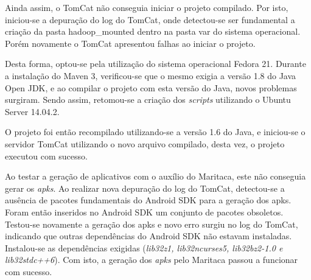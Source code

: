 Ainda assim, o TomCat não conseguia iniciar o projeto compilado. Por isto, iniciou-se a depuração do log do TomCat, onde detectou-se ser fundamental a criação da pasta hadoop\_mounted dentro na pasta var do sistema operacional. Porém novamente o TomCat apresentou falhas ao iniciar o projeto.

Desta forma, optou-se pela utilização do sistema operacional Fedora 21. Durante a instalação do Maven 3, verificou-se que o mesmo exigia a versão 1.8 do Java Open JDK, e ao compilar o projeto com esta versão do Java, novos problemas surgiram. Sendo assim, retomou-se a criação dos \textit{scripts} utilizando o Ubuntu Server 14.04.2.

O projeto foi então recompilado utilizando-se a versão 1.6 do Java, e iniciou-se o servidor TomCat utilizando o novo arquivo compilado, desta vez, o projeto executou com sucesso.

Ao testar a geração de aplicativos com o auxílio do Maritaca, este não conseguia gerar os \textit{apks}. Ao realizar nova depuração do log do TomCat, detectou-se a ausência de pacotes fundamentais do Android SDK para a geração dos apks. Foram então inseridos no Android SDK um conjunto de pacotes obsoletos. Testou-se novamente a geração dos apks e novo erro surgiu no log do TomCat, indicando que outras dependências do Android SDK não estavam instaladas. Instalou-se as dependências exigidas (\textit{lib32z1, lib32ncurses5, lib32bz2-1.0 e lib32stdc++6}). Com isto, a geração dos \textit{apks} pelo Maritaca passou a funcionar com sucesso.

